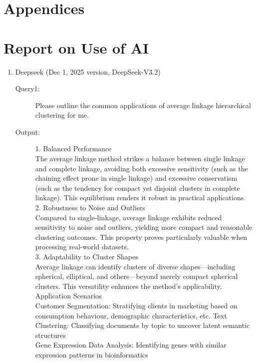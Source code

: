 \documentclass{mcmthesis} %
\begin{document}
\newpage



\newpage
\section*{Appendices}
%

\newpage
{}
\setcounter{lastpage}{\value{page}}
\thispagestyle{empty} 

\newpage
\section*{Report on Use of AI}
\begin{enumerate}
\item Deepseek (Dec 1, 2025 version, DeepSeek-V3.2) 
\begin{description}
\item[Query1:] Please outline the common applications of average linkage hierarchical clustering for me.
\item[Output:] 
1. Balanced Performance\\
The average linkage method strikes a balance between single linkage and complete linkage, avoiding both excessive sensitivity (such as the chaining effect prone in single linkage) and excessive conservatism (such as the tendency for compact yet disjoint clusters in complete linkage). This equilibrium renders it robust in practical applications.\\
2. Robustness to Noise and Outliers\\
Compared to single-linkage, average linkage exhibits reduced sensitivity to noise and outliers, yielding more compact and reasonable clustering outcomes. This property proves particularly valuable when processing real-world datasets.\\
3. Adaptability to Cluster Shapes\\
Average linkage can identify clusters of diverse shapes—including spherical, elliptical, and others—beyond merely compact spherical clusters. This versatility enhances the method's applicability.\\
Application Scenarios\\
Customer Segmentation: Stratifying clients in marketing based on consumption behaviour, demographic characteristics, etc.
Text Clustering: Classifying documents by topic to uncover latent semantic structures\\
Gene Expression Data Analysis: Identifying genes with similar expression patterns in bioinformatics\\

\end{description}
\end{enumerate}
\end{document}
